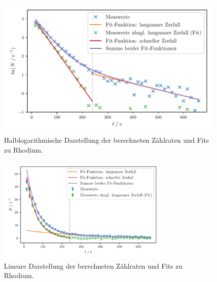 \begin{figure}
  \centering
  \includegraphics[width=\textwidth]{build/plot2_log.pdf}
  \caption{Halblogarithmische Darstellung der berechneten Zählraten und Fits zu Rhodium.}
  \label{fig:plot2_log}
\end{figure}

\begin{figure}
  \centering
  \includegraphics[width=0.75\textwidth]{build/plot2_lin.pdf}
  \caption{Lineare Darstellung der berechneten Zählraten und Fits zu Rhodium.}
  \label{fig:plot2_lin}
\end{figure}
